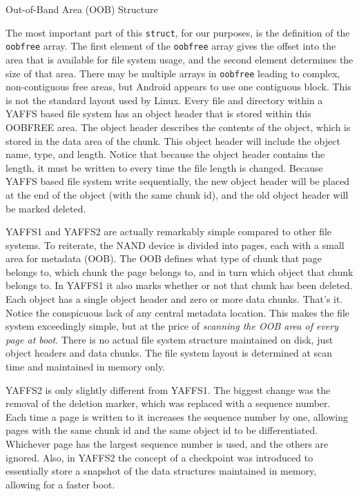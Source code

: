 \begin{table}[htb]

\caption{Out-of-Band Area (OOB) Structure}
\label{tab:oob}
\end{table}

The most important part of this \texttt{struct}, for our purposes, is the definition of the \texttt{oobfree} array.  The first element of the
\texttt{oobfree} array gives the offset into the area that is available for file system usage, and the second element determines the
size of that area.  There may be multiple arrays in \texttt{oobfree} leading to complex, non-contiguous free areas, but Android
appears to use one contiguous block.  This is not the standard layout used by Linux. Every file and directory within a YAFFS based
file system has an object header that is stored within this OOBFREE area. The object header describes the contents of the object,
which is stored in the data area of the chunk. This object header will include the object name, type, and length.  Notice that
because the object header contains the length, it must be written to every time the file length is changed.  Because YAFFS based
file system write sequentially, the new object header will be placed at the end of the object (with the same chunk id), and the old
object header will be marked deleted. 

YAFFS1 and YAFFS2 are actually remarkably simple compared to other file systems. To reiterate, the NAND device is divided into
pages, each with a small area for metadata (OOB).  The OOB defines what type of chunk that page belongs to, which chunk the page
belongs to, and in turn which object that chunk belongs to.  In YAFFS1 it also marks whether or not that chunk has been deleted.
Each object has a single object header and zero or more data chunks.  That's it.  Notice the conspicuous lack of any central
metadata location.  This makes the file system exceedingly simple, but at the price of \emph{scanning the OOB area of every page at
boot}.  There is no actual file system structure maintained on disk, just object headers and data chunks.  The file system layout is
determined at scan time and maintained in memory only. 

YAFFS2 is only slightly different from YAFFS1. The biggest change was the removal of the deletion marker, which was replaced with a
sequence number. Each time a page is written to it increases the sequence number by one, allowing pages with the same chunk id and
the same object id to be differentiated.  Whichever page has the largest sequence number is used, and the others are ignored.  Also,
in YAFFS2 the concept of a checkpoint was introduced to essentially store a snapshot of the data structures maintained in memory,
allowing for a faster boot.

